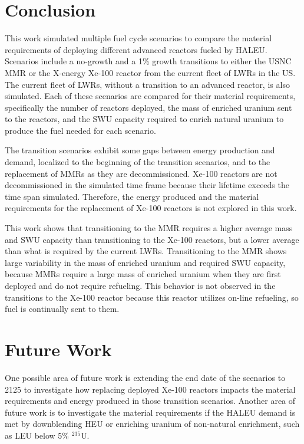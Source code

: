 \section{Conclusion}
This work simulated multiple fuel cycle scenarios to compare the 
material requirements of deploying different advanced reactors fueled 
by \gls{HALEU}. Scenarios include a no-growth and a 1\% growth 
transitions to either the \gls{USNC} \gls{MMR} or the X-energy Xe-100 
reactor from the current fleet of \glspl{LWR} in the US. The current 
fleet of \glspl{LWR}, without a transition to an advanced reactor, is 
also simulated. Each of these scenarios are compared for their material 
requirements, specifically the number of reactors deployed, the mass 
of enriched uranium sent to the reactors, and the \gls{SWU} capacity 
required to enrich natural uranium to produce the fuel needed for 
each scenario. 

The transition scenarios exhibit some gaps between  
energy production and demand, localized to the beginning of the 
transition
scenarios, and to the replacement of \glspl{MMR} as they are decommissioned. 
Xe-100 reactors are not decommissioned in the simulated time frame because 
their lifetime exceeds the time span simulated. Therefore, the 
energy produced and the material requirements for the replacement of 
Xe-100 reactors is not explored in this work. 

This work shows that transitioning to the \gls{MMR} requires 
a higher average mass and \gls{SWU} capacity than transitioning to the 
Xe-100 reactors, but a lower average than what is required by the current 
\glspl{LWR}. Transitioning to the \gls{MMR} shows large variability in 
the mass of enriched uranium and required \gls{SWU} capacity, because 
\glspl{MMR} require a large mass of enriched uranium when they are 
first deployed and do not require refueling. This behavior is not observed 
in the transitions to the Xe-100 reactor because this reactor utilizes 
on-line refueling, so fuel is continually sent to them. 

\section{Future Work}
One possible area of future work is extending the end date 
of the scenarios to 2125 to investigate how replacing deployed Xe-100 
reactors impacts the material requirements and energy produced in those 
transition scenarios. Another area of future work is to investigate the 
material requirements if the \gls{HALEU} demand is met by downblending 
\gls{HEU} or enriching uranium of non-natural enrichment, such as 
\gls{LEU} below 5\% $^{235}$U.  
